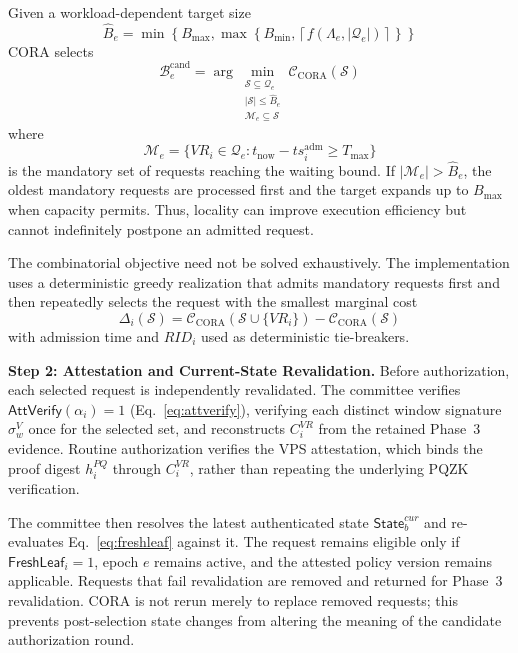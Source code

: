 \documentclass[lettersize,journal]{IEEEtran}
\begin{document}
Given a workload-dependent target size
\begin{equation}
\widehat{B}_e
=
\min\!\left\{
B_{\max},
\max\!\left\{
B_{\min},
\left\lceil
f(\Lambda_e,|\mathcal{Q}_e|)
\right\rceil
\right\}
\right\}
\end{equation}
CORA selects
\begin{equation}
\mathcal{B}_e^{\mathrm{cand}}
=
\arg\min_{\substack{
\mathcal{S}\subseteq\mathcal{Q}_e\\
|\mathcal{S}|\leq\widehat{B}_e\\
\mathcal{M}_e\subseteq\mathcal{S}
}}
\mathcal{C}_{\mathrm{CORA}}(\mathcal{S})
\end{equation}
where
\begin{equation}
\mathcal{M}_e=
\{VR_i\in\mathcal{Q}_e:
t_{\mathrm{now}}-ts_i^{\mathrm{adm}}\geq T_{\max}\}
\end{equation}
is the mandatory set of requests reaching the waiting bound. If
$|\mathcal{M}_e|>\widehat{B}_e$, the oldest mandatory requests are
processed first and the target expands up to $B_{\max}$ when capacity
permits. Thus, locality can improve execution efficiency but cannot
indefinitely postpone an admitted request.

The combinatorial objective need not be solved exhaustively. The
implementation uses a deterministic greedy realization that admits
mandatory requests first and then repeatedly selects the request with
the smallest marginal cost
\begin{equation}
\Delta_i(\mathcal{S})
=
\mathcal{C}_{\mathrm{CORA}}
(\mathcal{S}\cup\{VR_i\})
-
\mathcal{C}_{\mathrm{CORA}}(\mathcal{S})
\end{equation}
with admission time and $RID_i$ used as deterministic tie-breakers.

\medskip
\noindent\textbf{Step 2: Attestation and Current-State Revalidation.}
Before authorization, each selected request is independently
revalidated. The committee verifies
$\mathsf{AttVerify}(\alpha_i)=1$
(Eq.~\eqref{eq:attverify}), verifying each distinct window signature
$\sigma_w^{V}$ once for the selected set,
and reconstructs $C_i^{VR}$ from the retained Phase~3 evidence.
Routine authorization verifies the VPS attestation, which
binds the proof digest $h_i^{PQ}$ through $C_i^{VR}$,
rather than repeating the underlying PQZK verification.

The committee then resolves the latest authenticated state
$\mathsf{State}_b^{cur}$ and re-evaluates
Eq.~\eqref{eq:freshleaf} against it.
The request remains eligible only if
$\mathsf{FreshLeaf}_i=1$,
epoch $e$ remains active, and the attested policy version remains
applicable. Requests that fail revalidation are removed and returned
for Phase~3 revalidation. CORA is not rerun merely to replace removed
requests; this prevents post-selection state changes from altering the
meaning of the candidate authorization round.
\end{document}
